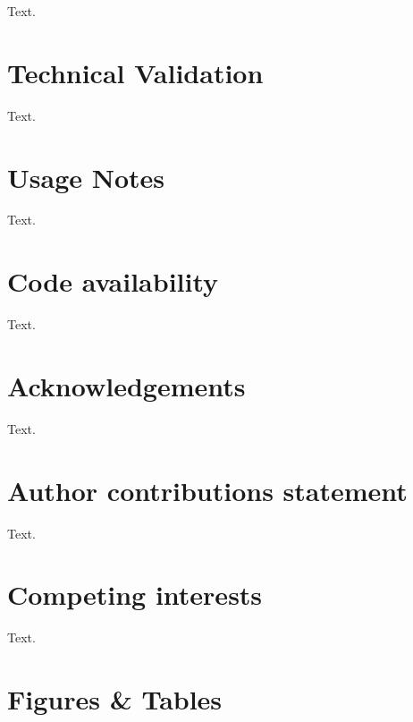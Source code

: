 \documentclass[fleqn,10pt]{wlscirep}
\begin{document}
Text.

\hypertarget{technical-validation}{%
\section*{Technical Validation}\label{technical-validation}}

Text.

\hypertarget{usage-notes}{%
\section*{Usage Notes}\label{usage-notes}}

Text.

\hypertarget{code-availability}{%
\section*{Code availability}\label{code-availability}}

Text.

\hypertarget{acknowledgements}{%
\section*{Acknowledgements}\label{acknowledgements}}

Text.

\hypertarget{author-contributions-statement}{%
\section*{Author contributions statement}\label{author-contributions-statement}}

Text.

\hypertarget{competing-interests}{%
\section*{Competing interests}\label{competing-interests}}

Text.

\hypertarget{figures-tables}{%
\section*{Figures \& Tables}\label{figures-tables}}
\end{document}
